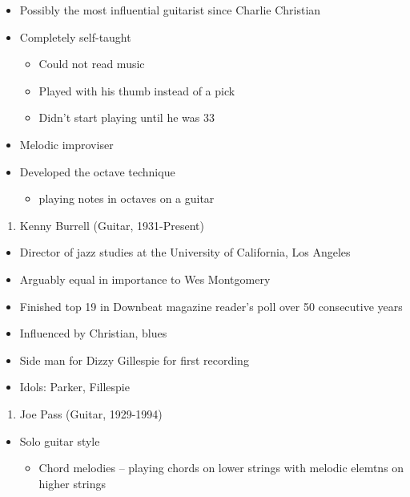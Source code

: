 \documentclass[]{article}
\providecommand{\tightlist}{%
  \setlength{\itemsep}{0pt}\setlength{\parskip}{0pt}}
\begin{document}
\begin{itemize}
\tightlist
\item
  Possibly the most influential guitarist since Charlie Christian
\item
  Completely self-taught

  \begin{itemize}
  \tightlist
  \item
    Could not read music
  \item
    Played with his thumb instead of a pick
  \item
    Didn't start playing until he was 33
  \end{itemize}
\item
  Melodic improviser
\item
  Developed the octave technique

  \begin{itemize}
  \tightlist
  \item
    playing notes in octaves on a guitar
  \end{itemize}
\end{itemize}

\begin{enumerate}
\def\labelenumi{\arabic{enumi}.}
\setcounter{enumi}{13}
\tightlist
\item
  Kenny Burrell (Guitar, 1931-Present)
\end{enumerate}

\begin{itemize}
\tightlist
\item
  Director of jazz studies at the University of California, Los Angeles
\item
  Arguably equal in importance to Wes Montgomery
\item
  Finished top 19 in Downbeat magazine reader's poll over 50 consecutive
  years
\item
  Influenced by Christian, blues
\item
  Side man for Dizzy Gillespie for first recording
\item
  Idols: Parker, Fillespie
\end{itemize}

\begin{enumerate}
\def\labelenumi{\arabic{enumi}.}
\setcounter{enumi}{14}
\tightlist
\item
  Joe Pass (Guitar, 1929-1994)
\end{enumerate}

\begin{itemize}
\tightlist
\item
  Solo guitar style

  \begin{itemize}
  \tightlist
  \item
    Chord melodies -- playing chords on lower strings with melodic
    elemtns on higher strings
  \end{itemize}
\end{itemize}
\end{document}
